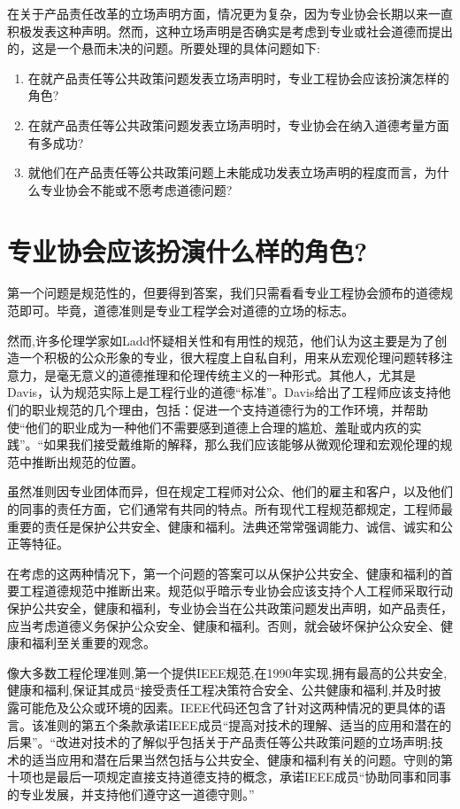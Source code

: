 \documentclass[lang=cn,11pt,a4paper]{elegantpaper}
\begin{document}
在关于产品责任改革的立场声明方面，情况更为复杂，因为专业协会长期以来一直积极发表这种声明。然而，这种立场声明是否确实是考虑到专业或社会道德而提出的，这是一个悬而未决的问题。所要处理的具体问题如下:
\begin{enumerate}
  \item 在就产品责任等公共政策问题发表立场声明时，专业工程协会应该扮演怎样的角色?
  \item 在就产品责任等公共政策问题发表立场声明时，专业协会在纳入道德考量方面有多成功?
  \item 就他们在产品责任等公共政策问题上未能成功发表立场声明的程度而言，为什么专业协会不能或不愿考虑道德问题?
\end{enumerate}

\section{专业协会应该扮演什么样的角色?\cite{1,9}}
第一个问题是规范性的，但要得到答案，我们只需看看专业工程协会颁布的道德规范即可。毕竟，道德准则是专业工程学会对道德的立场的标志。

然而,许多伦理学家如Ladd\cite{3}怀疑相关性和有用性的规范，他们认为这主要是为了创造一个积极的公众形象的专业，很大程度上自私自利，用来从宏观伦理问题转移注意力，是毫无意义的道德推理和伦理传统主义的一种形式。其他人，尤其是Davis，认为规范实际上是工程行业的道德“标准”。Davis\cite{14}给出了工程师应该支持他们的职业规范的几个理由，包括：促进一个支持道德行为的工作环境，并帮助使“他们的职业成为一种他们不需要感到道德上合理的尴尬、羞耻或内疚的实践”。“如果我们接受戴维斯的解释，那么我们应该能够从微观伦理和宏观伦理的规范中推断出规范的位置。

虽然准则因专业团体而异，但在规定工程师对公众、他们的雇主和客户，以及他们的同事的责任方面，它们通常有共同的特点。所有现代工程规范都规定，工程师最重要的责任是保护公共安全、健康和福利。法典还常常强调能力、诚信、诚实和公正等特征。\cite{13}

在考虑的这两种情况下，第一个问题的答案可以从保护公共安全、健康和福利的首要工程道德规范中推断出来。规范似乎暗示专业协会应该支持个人工程师采取行动保护公共安全，健康和福利，专业协会当在公共政策问题发出声明，如产品责任，应当考虑道德义务保护公众安全、健康和福利。否则，就会破坏保护公众安全、健康和福利至关重要的观念。

像大多数工程伦理准则,第一个提供IEEE规范,在1990年实现,拥有最高的公共安全,健康和福利,保证其成员“接受责任工程决策符合安全、公共健康和福利,并及时披露可能危及公众或环境的因素。IEEE代码还包含了针对这两种情况的更具体的语言。该准则的第五个条款承诺IEEE成员“提高对技术的理解、适当的应用和潜在的后果”。“改进对技术的了解似乎包括关于产品责任等公共政策问题的立场声明;技术的适当应用和潜在后果当然包括与公共安全、健康和福利有关的问题。守则的第十项也是最后一项规定直接支持道德支持的概念，承诺IEEE成员“协助同事和同事的专业发展，并支持他们遵守这一道德守则。”
\end{document}

